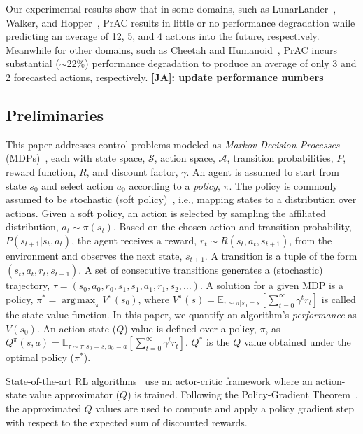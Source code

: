 \documentclass[letterpaper]{article} %
\newcommand{\JA}[1] {{\color{red} \textbf{[JA]: #1}}}
\DeclareMathOperator*{\argmax}{arg\,max}
\begin{document}
Our experimental results show that in some domains, such as LunarLander~\cite{gym}, Walker, and Hopper~\cite{pybullet}, PrAC results in little or no performance degradation while predicting an average of 12, 5, and 4 actions into the future, respectively. Meanwhile for other domains, such as Cheetah and Humanoid~\cite{pybullet}, PrAC incurs substantial ($\sim$22\%) performance degradation to produce an average of only 3 and 2 forecasted actions, respectively.\JA{update performance numbers}

\subsection{Preliminaries} 
This paper addresses control problems modeled as \textit{Markov Decision Processes} (MDPs)~\cite{puterman2014markov}, each with state space, $\mathcal{S}$, action space, $\mathcal{A}$, transition probabilities, $P$, reward function, $R$, and discount factor, $\gamma$. 
An agent is assumed to start from state $s_0$ and select action $a_0$ according to a \textit{policy}, $\pi$. The policy is commonly assumed to be stochastic (soft policy)~\cite{haarnoja2018soft}, i.e., mapping states to a distribution over actions.
Given a soft policy, an action is selected by sampling the affiliated distribution, $a_t \sim \pi(s_t)$. Based on the chosen action and transition probability, $P(s_{t+1} | s_t, a_t)$, the agent receives a reward, $r_t \sim R(s_t, a_t, s_{t+1})$, from the environment and observes the next state, $s_{t+1}$. A transition is a tuple of the form $(s_t,a_t,r_t,s_{t+1})$. A set of consecutive transitions generates a (stochastic) trajectory, $\tau = (s_0, a_0, r_0, s_1, s_1, a_1, r_1, s_2,\ldots)$. A solution for a given MDP is a policy, $\pi^* = \argmax_{\pi} V^{\pi}(s_0)$, where $V^{\pi}(s)=\mathbb{E}_{\tau \sim \pi| s_0=s}[\sum_{t=0}^{\infty}\gamma^t r_t]$ is called the state value function. In this paper, we quantify an algorithm's \textit{performance} as $V(s_0)$. An action-state ($Q$) value is defined over a policy, $\pi$, as $Q^\pi(s,a)=\mathbb{E}_{\tau \sim \pi | s_0=s, a_0=a}[\sum_{t=0}^{\infty}\gamma^t r_t]$. $Q^*$ is the $Q$ value obtained under the optimal policy ($\pi^*$). %

State-of-the-art RL algorithms~\cite{haarnoja2018soft} use an actor-critic framework where an action-state value approximator ($Q$) is trained. Following the Policy-Gradient Theorem~\cite{reinforce}, the approximated $Q$ values are used to compute and apply a policy gradient step with respect to the expected sum of discounted rewards.
\end{document}
